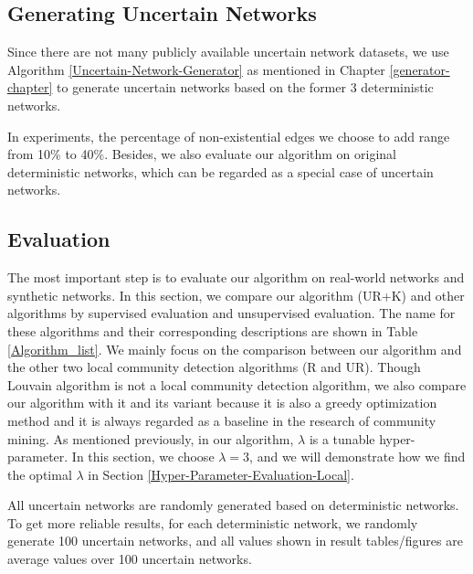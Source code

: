 \documentclass[\main/thesis.tex]{subfiles}
\begin{document}
\subsection*{Generating Uncertain Networks}
Since there are not many publicly available uncertain network datasets, we use Algorithm \ref{Uncertain-Network-Generator} as mentioned in Chapter \ref{generator-chapter} to generate uncertain networks based on the former 3 deterministic networks. 

In experiments, the percentage of non-existential edges we choose to add range from 10\% to 40\%. Besides, we also evaluate our algorithm on original deterministic networks, which can be regarded as a special case of uncertain networks.

\subsection{Evaluation}
The most important step is to evaluate our algorithm on real-world networks and synthetic networks. In this section, we compare our algorithm (UR+K) and other algorithms by supervised evaluation and unsupervised evaluation. The name for these algorithms and their corresponding descriptions are shown in Table \ref{Algorithm_list}. We mainly focus on the comparison between our algorithm and the other two local community detection algorithms (R and UR). Though Louvain algorithm is not a local community detection algorithm, we also compare our algorithm with it and its variant because it is also a greedy optimization method and it is always regarded as a baseline in the research of community mining. As mentioned previously, in our algorithm, $\lambda$ is a tunable hyper-parameter. In this section, we choose $\lambda=3$, and we will demonstrate how we find the optimal $\lambda$ in Section \ref{Hyper-Parameter-Evaluation-Local}.

All uncertain networks are randomly generated based on deterministic networks. To get more reliable results, for each deterministic network, we randomly generate 100 uncertain networks, and all values shown in result tables/figures are average values over 100 uncertain networks.
\end{document}
